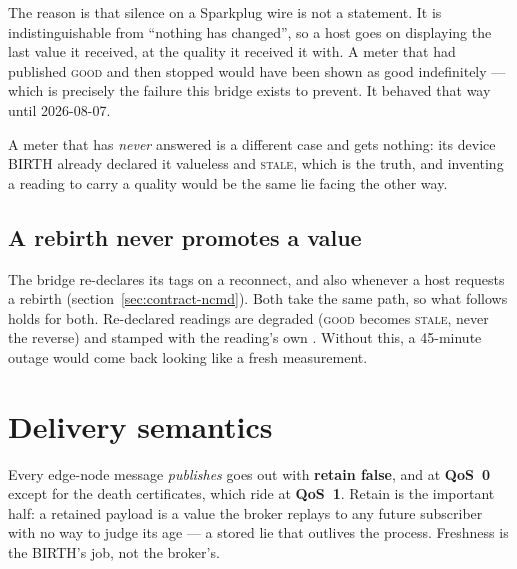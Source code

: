 The reason is that silence on a Sparkplug wire is not a statement. It is indistinguishable
from ``nothing has changed'', so a host goes on displaying the last value it received, at the
quality it received it with. A meter that had published \textsc{good} and then stopped would
have been shown as good indefinitely --- which is precisely the failure this bridge exists to
prevent. It behaved that way until 2026-08-07.

A meter that has \emph{never} answered is a different case and gets nothing: its device BIRTH
already declared it valueless and \textsc{stale}, which is the truth, and inventing a reading
to carry a quality would be the same lie facing the other way.

\subsection{A rebirth never promotes a value}

The bridge re-declares its tags on a reconnect, and also whenever a host requests a rebirth
(section~\ref{sec:contract-ncmd}). Both take the same path, so what follows holds for both.
Re-declared readings are degraded
(\textsc{good} becomes \textsc{stale}, never the reverse) and stamped with the reading's
own . Without this, a 45-minute outage would come back looking like a
fresh measurement.

\section{Delivery semantics}

Every edge-node message \prog \emph{publishes} goes out with \textbf{retain false}, and at
\textbf{QoS~0} except for the death certificates, which ride at \textbf{QoS~1}. Retain is
the important half: a retained payload is a value the broker replays to any future
subscriber with no way to judge its age --- a stored lie that outlives the process.
Freshness is the BIRTH's job, not the broker's.

